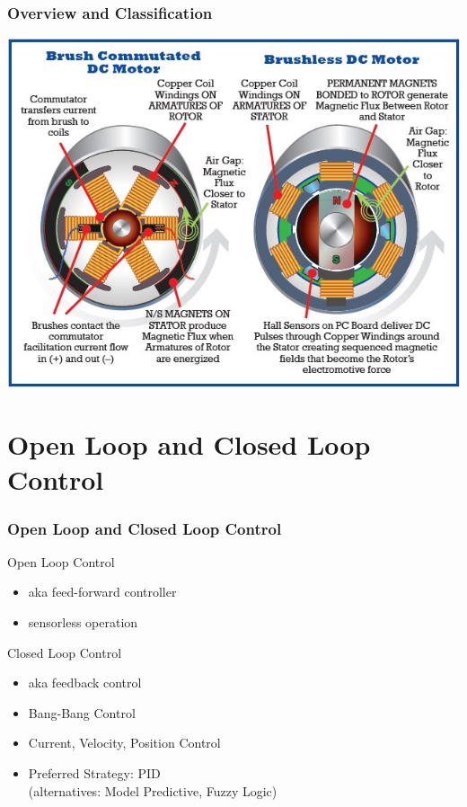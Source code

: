 \documentclass[fleqn]{beamer} %
\newcommand{\sectiontitleI}{Overview and Classification}
\newcommand{\sectiontitleII}{Open Loop and Closed Loop Control}
\begin{document}
	\begin{frame}[label=sectionI] \small
		\frametitle{\sectiontitleI}	
		
		\includegraphics[scale=0.5]{images/brushed_brushless.jpg}

	\end{frame}


\section{\sectiontitleII}	

	\begin{frame} \small
		\frametitle{\sectiontitleII}

		Open Loop Control
		\begin{itemize}
			\item aka feed-forward controller
			\item sensorless operation

		\end{itemize}

		Closed Loop Control
		\begin{itemize}
			\item aka feedback control
			\item Bang-Bang Control
			\item Current, Velocity, Position Control
			\item Preferred Strategy: PID\\
			(alternatives: Model Predictive, Fuzzy Logic)
		\end{itemize}

	\end{frame}
\end{document}
